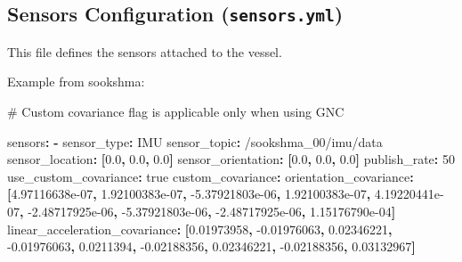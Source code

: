 \documentclass[
  letterpaper,
  DIV=11,
  numbers=noendperiod]{scrreprt}
\newenvironment{Shaded}{\begin{snugshade}}{\end{snugshade}}
\newcommand{\AttributeTok}[1]{\textcolor[rgb]{0.40,0.45,0.13}{#1}}
\newcommand{\CharTok}[1]{\textcolor[rgb]{0.13,0.47,0.30}{#1}}
\newcommand{\CommentTok}[1]{\textcolor[rgb]{0.37,0.37,0.37}{#1}}
\newcommand{\DecValTok}[1]{\textcolor[rgb]{0.68,0.00,0.00}{#1}}
\newcommand{\FloatTok}[1]{\textcolor[rgb]{0.68,0.00,0.00}{#1}}
\newcommand{\FunctionTok}[1]{\textcolor[rgb]{0.28,0.35,0.67}{#1}}
\newcommand{\KeywordTok}[1]{\textcolor[rgb]{0.00,0.23,0.31}{\textbf{#1}}}
\begin{document}
\subsection*{\texorpdfstring{Sensors Configuration
(\texttt{sensors.yml})}{Sensors Configuration (sensors.yml)}}\label{sensors-configuration-sensors.yml}

This file defines the sensors attached to the vessel.

Example from sookshma:

\begin{Shaded}
\begin{Highlighting}[]
\CommentTok{\# Custom covariance flag is applicable only when using GNC}

\FunctionTok{sensors}\KeywordTok{:}
\AttributeTok{  }\KeywordTok{{-}}\AttributeTok{ }
\AttributeTok{    }\FunctionTok{sensor\_type}\KeywordTok{:}\AttributeTok{ IMU}
\AttributeTok{    }\FunctionTok{sensor\_topic}\KeywordTok{:}\AttributeTok{ /sookshma\_00/imu/data}
\AttributeTok{    }\FunctionTok{sensor\_location}\KeywordTok{:}\AttributeTok{ }\KeywordTok{[}\FloatTok{0.0}\KeywordTok{,}\AttributeTok{ }\FloatTok{0.0}\KeywordTok{,}\AttributeTok{ }\FloatTok{0.0}\KeywordTok{]}\AttributeTok{          }
\AttributeTok{    }\FunctionTok{sensor\_orientation}\KeywordTok{:}\AttributeTok{ }\KeywordTok{[}\FloatTok{0.0}\KeywordTok{,}\AttributeTok{ }\FloatTok{0.0}\KeywordTok{,}\AttributeTok{ }\FloatTok{0.0}\KeywordTok{]}
\AttributeTok{    }\FunctionTok{publish\_rate}\KeywordTok{:}\AttributeTok{ }\DecValTok{50}\AttributeTok{        }
\AttributeTok{    }\FunctionTok{use\_custom\_covariance}\KeywordTok{:}\AttributeTok{ }\CharTok{true}
\AttributeTok{    }\FunctionTok{custom\_covariance}\KeywordTok{:}
\AttributeTok{      }\FunctionTok{orientation\_covariance}\KeywordTok{:}\AttributeTok{ }\KeywordTok{[}\FloatTok{4.97116638e{-}07}\KeywordTok{,}\AttributeTok{ }\FloatTok{1.92100383e{-}07}\KeywordTok{,}\AttributeTok{ }\FloatTok{{-}5.37921803e{-}06}\KeywordTok{,}\AttributeTok{ }\FloatTok{1.92100383e{-}07}\KeywordTok{,}\AttributeTok{ }\FloatTok{4.19220441e{-}07}\KeywordTok{,}\AttributeTok{ }\FloatTok{{-}2.48717925e{-}06}\KeywordTok{,}\AttributeTok{ }\FloatTok{{-}5.37921803e{-}06}\KeywordTok{,}\AttributeTok{ }\FloatTok{{-}2.48717925e{-}06}\KeywordTok{,}\AttributeTok{ }\FloatTok{1.15176790e{-}04}\KeywordTok{]}
\AttributeTok{      }\FunctionTok{linear\_acceleration\_covariance}\KeywordTok{:}\AttributeTok{ }\KeywordTok{[}\FloatTok{0.01973958}\KeywordTok{,}\AttributeTok{ }\FloatTok{{-}0.01976063}\KeywordTok{,}\AttributeTok{ }\FloatTok{0.02346221}\KeywordTok{,}\AttributeTok{ }\FloatTok{{-}0.01976063}\KeywordTok{,}\AttributeTok{ }\FloatTok{0.0211394}\KeywordTok{,}\AttributeTok{ }\FloatTok{{-}0.02188356}\KeywordTok{,}\AttributeTok{ }\FloatTok{0.02346221}\KeywordTok{,}\AttributeTok{ }\FloatTok{{-}0.02188356}\KeywordTok{,}\AttributeTok{ }\FloatTok{0.03132967}\KeywordTok{]}

\end{Highlighting}
\end{Shaded}
\end{document}
